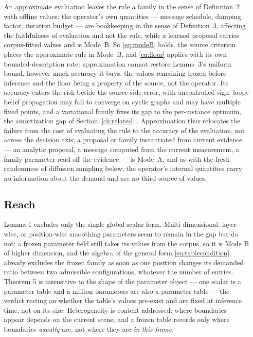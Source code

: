 An approximate evaluation leaves the rule a family in the sense of Definition~2 with offline values: the operator's own quantities --- message schedule, damping factor, iteration budget --- are bookkeeping in the sense of Definition~3, affecting the faithfulness of evaluation and not the rule, while a learned proposal carries corpus-fitted values and is Mode~B. So \eqref{eq:modeB} holds, the source criterion places the approximate rule in Mode~B, and \eqref{eq:floor} applies with its own bounded-description rate: approximation cannot restore Lemma~3's uniform bound, however much accuracy it buys, the values remaining frozen before inference and the floor being a property of the source, not the operator. Its accuracy enters the risk beside the source-side error, with uncontrolled sign: loopy belief propagation may fail to converge on cyclic graphs and may have multiple fixed points, and a variational family fixes its gap to the per-instance optimum, the amortization gap of Section~\ref{ch:related} \citep{cremer2018}. Approximation thus relocates the failure from the cost of evaluating the rule to the accuracy of the evaluation, not across the decision axis; a proposal or family instantiated from current evidence --- an analytic proposal, a message computed from the current measurement, a family parameter read off the evidence --- is Mode~A, and as with the fresh randomness of diffusion sampling below, the operator's internal quantities carry no information about the demand and are no third source of values.

\subsection{Reach}

Lemma 1 excludes only the single global scalar form. Multi-dimensional, layer-wise, or position-wise smoothing parameters seem to remain in the gap but do not: a frozen parameter field still takes its values from the corpus, so it is Mode B of higher dimension, and the algebra of the general form \eqref{eq:tablecondition} already excludes the frozen family as soon as one position changes its demanded ratio between two admissible configurations, whatever the number of entries. Theorem 5 is insensitive to the shape of the parameter object --- one scalar is a parameter table and a million parameters are also a parameter table --- the verdict resting on whether the table's values pre-exist and are fixed at inference time, not on its size. Heterogeneity is content-addressed: where boundaries appear depends on the current scene, and a frozen table records only where boundaries \emph{usually} are, not where they are \emph{in this frame}.

